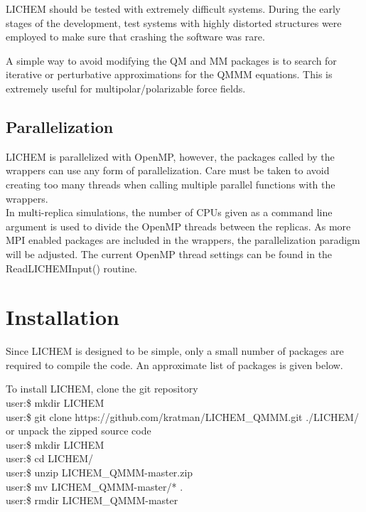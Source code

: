 \documentclass[12pt]{report}
\begin{document}
LICHEM should be tested with extremely difficult systems.
During the early stages of the development, test systems with highly distorted
structures were employed to make sure that crashing the software was rare.

A simple way to avoid modifying the QM and MM packages is to search for
iterative or perturbative approximations for the QMMM equations.
This is extremely useful for multipolar/polarizable force fields.

\subsection{Parallelization}

LICHEM is parallelized with OpenMP, however, the packages called by the
wrappers can use any form of parallelization.
Care must be taken to avoid creating too many threads when calling multiple
parallel functions with the wrappers. \\

In multi-replica simulations, the number of CPUs given as a command line
argument is used to divide the OpenMP threads between the replicas.
As more MPI enabled packages are included in the wrappers, the parallelization
paradigm will be adjusted.
The current OpenMP thread settings can be found in the ReadLICHEMInput()
routine.

\section{Installation}

Since LICHEM is designed to be simple, only a small number of packages are
required to compile the code.
An approximate list of packages is given below.
\begin{quote}
\end{quote}

To install LICHEM, clone the git repository \\

user:\$ mkdir LICHEM \\
user:\$ git clone https://github.com/kratman/LICHEM\_QMMM.git ./LICHEM/ \\

or unpack the zipped source code \\

user:\$ mkdir LICHEM \\
user:\$ cd LICHEM/ \\
user:\$ unzip LICHEM\_QMMM-master.zip \\
user:\$ mv LICHEM\_QMMM-master/* . \\
user:\$ rmdir LICHEM\_QMMM-master \\
\end{document}
